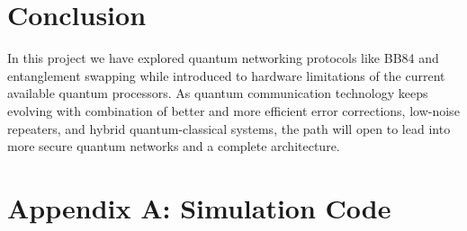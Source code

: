 \documentclass[12pt]{ieeetj}
\begin{document}
\section{Conclusion}

	In this project we have explored quantum networking protocols like BB84 and entanglement swapping while introduced to hardware 
	limitations of the current available quantum processors. 
	As quantum communication technology keeps evolving with combination of better and more efficient error corrections, low-noise repeaters, 
	and hybrid quantum-classical systems, the path will open to lead into more secure quantum networks and a complete architecture.

\newpage


\newpage
\appendix

\section{Appendix A: Simulation Code }
\end{document}

